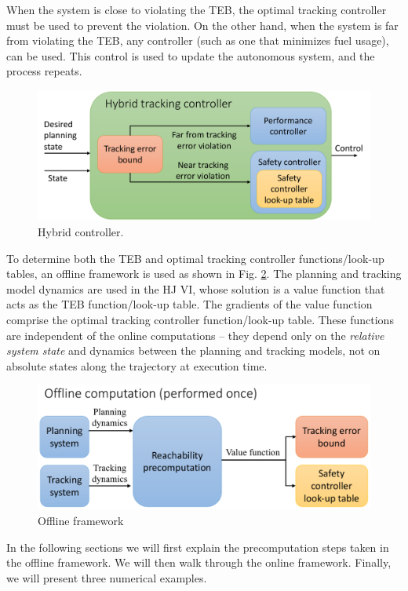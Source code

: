 When the system is close to violating the TEB, the optimal tracking controller must be used to prevent the violation. 
On the other hand, when the system is far from violating the TEB, any controller (such as one that minimizes fuel usage), can be used. 
This control is used to update the autonomous system, and the process repeats.

\begin{figure}[h!]
  \centering
	\includegraphics[width=0.9\columnwidth]{fig/hybrid_controller}
	\caption{Hybrid controller. }
	\label{fig:hybrid_ctrl}
\end{figure}

To determine both the TEB and optimal tracking controller functions/look-up tables, an offline framework is used as shown in Fig. \ref{fig:fw_offline}. 
The planning and tracking model dynamics are used in the HJ VI, whose solution is a value function that acts as the TEB function/look-up table. 
The gradients of the value function comprise the optimal tracking controller function/look-up table. 
These functions are independent of the online computations -- they depend only on the \textit{relative system state} and dynamics between the planning and tracking models, not on absolute states along the trajectory at execution time.

\begin{figure}[h!]
  \centering
	\includegraphics[width=0.9\columnwidth]{fig/framework_offline}
	\caption{Offline framework}
	\label{fig:fw_offline}
\end{figure}
In the following sections we will first explain the precomputation steps taken in the offline framework. 
We will then walk through the online framework.
Finally, we will present three numerical examples.

